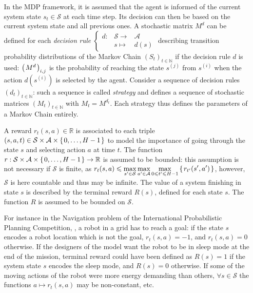 In the MDP framework, it is assumed that 
the agent is informed of the current system state $s_t \in \mathcal{S}$
at each time step. 
Its decision can then be based on 
the current system state and all previous ones.
A stochastic matrix $M^{d}$ can be defined for
each \textit{decision rule} $\left \{ \begin{array}{ccc}
d : & \mathcal{S} \rightarrow & \mathcal{A} \\
& s \mapsto & d(s)
 \end{array} \right.$ describing transition probability distributions  
of the Markov Chain $(S_t)_{t \in \mathbb{N}}$
if the decision rule $d$ is used: 
$\left( \left. M^{d} \right. \right)_{i,j}$ is the probability of reaching the state $s^{(j)}$ from $s^{(i)}$  
when the action $d(s^{(i)})$ is selected by the agent. 
Consider a sequence of decision rules
$(d_t)_{t \in \mathbb{N}}$: 
such a sequence is called \textit{strategy} 
and defines a sequence of stochastic matrices 
$(M_t)_{t \in \mathbb{N}}$ 
with $M_t=M^{d_t}$. 
Each strategy thus defines the parameters of a Markov Chain entirely. 

A reward $r_t(s,a) \in \mathbb{R}$ is associated 
to each triple $(s,a,t) \in \mathcal{S} \times \mathcal{A} \times \left\{ \left.  0, \ldots, H-1  \right. \right\}$
to model the importance of going through the state $s$
and selecting action $a$ at time $t$.
The function $r: \mathcal{S} \times \mathcal{A} \times \left\{ \left.  0, \ldots, H-1  \right. \right\} \rightarrow \mathbb{R}$
is assumed to be bounded:
this assumption is not necessary if 
$\mathcal{S}$ is finite, as 
$r_t(s,a) \leqslant \displaystyle \max_{s' \in \mathcal{S}}  \max_{ a' \in \mathcal{A}} \max_{ 0 \leqslant t' \leqslant H-1} \left\{ \left.  r_{t'}(s',a') \right. \right\}$,
however, $\mathcal{S}$ is here countable 
and thus may be infinite.
The value of a system finishing in state $s$
is described by the terminal reward $R(s)$, 
defined for each state $s$. The function $R$
is assumed to be bounded on $\mathcal{S}$.

For instance in the Navigation problem 
of the International Probabilistic Planning Competition,
\cite{SannerIPPC1111}, a robot in a grid has to reach a goal:
if the state $s$ encodes a robot location which is not the goal,
$r_t(s,a)=-1$, and $r_t(s,a)=0$ otherwise.
If the designers of the model want
the robot to be in sleep mode
at the end of the mission,
terminal reward could have been defined
as $R(s)=1$ if the system state $s$ 
encodes the sleep mode, and $R(s)=0$ otherwise.
If some of the moving actions of the robot 
were more energy demanding than others,
$\forall s \in \mathcal{S}$ 
the functions $a \mapsto r_t(s,a)$ may be non-constant, etc.

